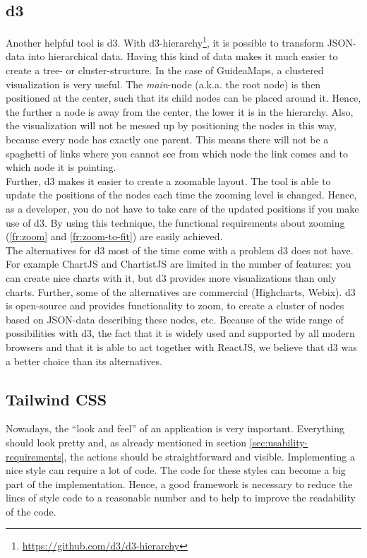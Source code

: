 \subsection{d3}\label{sec:d3}
Another helpful tool is d3. With d3-hierarchy\footnote{\url{https://github.com/d3/d3-hierarchy}}, it is possible to transform JSON-data into hierarchical data. Having this kind of data makes it much easier to create a tree- or cluster-structure. In the case of GuideaMaps, a clustered visualization is very useful. The \textit{main}-node (a.k.a. the root node) is then positioned at the center, such that its child nodes can be placed around it. Hence, the further a node is away from the center, the lower it is in the hierarchy. Also, the visualization will not be messed up by positioning the nodes in this way, because every node has exactly one parent. This means there will not be a spaghetti of links where you cannot see from which node the link comes and to which node it is pointing.\\

Further, d3 makes it easier to create a zoomable layout. The tool is able to update the positions of the nodes each time the zooming level is changed. Hence, as a developer, you do not have to take care of the updated positions if you make use of d3. By using this technique, the functional requirements about zooming (\ref{fr:zoom} and \ref{fr:zoom-to-fit}) are easily achieved.\\

The alternatives for d3 most of the time come with a problem d3 does not have. For example ChartJS and ChartistJS are limited in the number of features: you can create nice charts with it, but d3 provides more visualizations than only charts. Further, some of the alternatives are commercial (Highcharts, Webix). d3 is open-source and provides functionality to zoom, to create a cluster of nodes based on JSON-data describing these nodes, etc. Because of the wide range of possibilities with d3, the fact that it is widely used and supported by all modern browsers and that it is able to act together with ReactJS, we believe that d3 was a better choice than its alternatives. 

\subsection{Tailwind CSS}\label{sec:tailwind}
Nowadays, the ``look and feel'' of an application is very important. Everything should look pretty and, as already mentioned in section \ref{sec:usability-requirements}, the actions should be straightforward and visible. Implementing a nice style can require a lot of code. The code for these styles can become a big part of the implementation. Hence, a good framework is necessary to reduce the lines of style code to a reasonable number and to help to improve the readability of the code.\\

